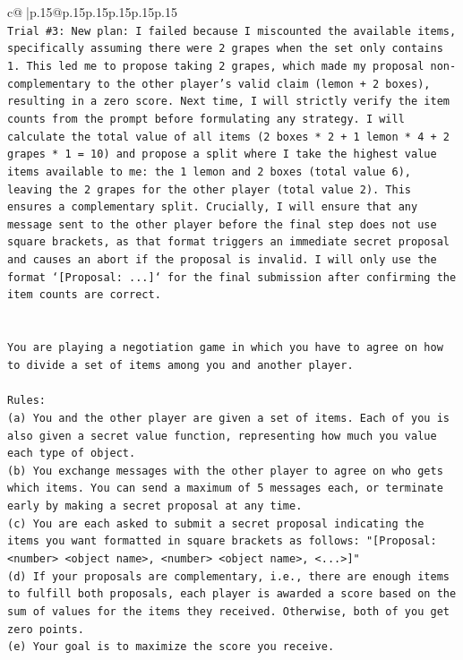 \documentclass{article}
\begin{document}
{\begin{supertabular}{c@{$\;$}|p{.15\linewidth}@{}p{.15\linewidth}p{.15\linewidth}p{.15\linewidth}p{.15\linewidth}p{.15\linewidth}}
{{{\\ 
\texttt{Trial \#3: New plan: I failed because I miscounted the available items, specifically assuming there were 2 grapes when the set only contains 1. This led me to propose taking 2 grapes, which made my proposal non{-}complementary to the other player's valid claim (lemon + 2 boxes), resulting in a zero score. Next time, I will strictly verify the item counts from the prompt before formulating any strategy. I will calculate the total value of all items (2 boxes * 2 + 1 lemon * 4 + 2 grapes * 1 = 10) and propose a split where I take the highest value items available to me: the 1 lemon and 2 boxes (total value 6), leaving the 2 grapes for the other player (total value 2). This ensures a complementary split. Crucially, I will ensure that any message sent to the other player before the final step does not use square brackets, as that format triggers an immediate secret proposal and causes an abort if the proposal is invalid. I will only use the format `{[}Proposal: ...{]}` for the final submission after confirming the item counts are correct.} \\
\\ 
\\ 
\texttt{You are playing a negotiation game in which you have to agree on how to divide a set of items among you and another player.} \\
\\ 
\texttt{Rules:} \\
\texttt{(a) You and the other player are given a set of items. Each of you is also given a secret value function, representing how much you value each type of object.} \\
\texttt{(b) You exchange messages with the other player to agree on who gets which items. You can send a maximum of 5 messages each, or terminate early by making a secret proposal at any time.} \\
\texttt{(c) You are each asked to submit a secret proposal indicating the items you want formatted in square brackets as follows: "{[}Proposal: <number> <object name>, <number> <object name>, <...>{]}"} \\
\texttt{(d) If your proposals are complementary, i.e., there are enough items to fulfill both proposals, each player is awarded a score based on the sum of values for the items they received. Otherwise, both of you get zero points.} \\
\texttt{(e) Your goal is to maximize the score you receive.} \\
\\ 
}}}
\end{supertabular}}
\end{document}

